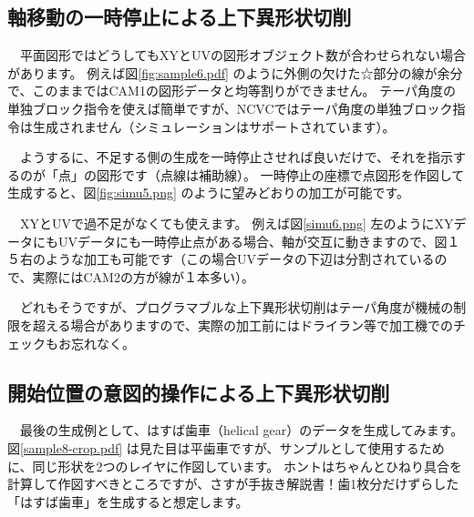 \subsection{軸移動の一時停止による上下異形状切削}
　平面図形ではどうしてもXYとUVの図形オブジェクト数が合わせられない場合があります。
例えば図\ref{fig:sample6.pdf} のように外側の欠けた☆部分の線が余分で、このままではCAM1の図形データと均等割りができません。
テーパ角度の単独ブロック指令を使えば簡単ですが、NCVCではテーパ角度の単独ブロック指令は生成されません（シミュレーションはサポートされています）。


　ようするに、不足する側の生成を一時停止させれば良いだけで、それを指示するのが「点」の図形です（点線は補助線）。
一時停止の座標で点図形を作図して生成すると、図\ref{fig:simu5.png} のように望みどおりの加工が可能です。


　XYとUVで過不足がなくても使えます。
例えば図\ref{simu6.png} 左のようにXYデータにもUVデータにも一時停止点がある場合、軸が交互に動きますので、図１５右のような加工も可能です（この場合UVデータの下辺は分割されているので、実際にはCAM2の方が線が１本多い）。


　どれもそうですが、プログラマブルな上下異形状切削はテーパ角度が機械の制限を超える場合がありますので、実際の加工前にはドライラン等で加工機でのチェックもお忘れなく。

\subsection{開始位置の意図的操作による上下異形状切削}
　最後の生成例として、はすば歯車（helical gear）のデータを生成してみます。
図\ref{sample8-crop.pdf} は見た目は平歯車ですが、サンプルとして使用するために、同じ形状を2つのレイヤに作図しています。
ホントはちゃんとひねり具合を計算して作図すべきところですが、さすが手抜き解説書！歯1枚分だけずらした「はすば歯車」を生成すると想定します。

